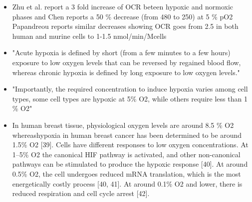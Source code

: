 \documentclass[11pt,a4paper]{article}
\begin{document}
\begin{itemize}
\item Zhu et al. report a 3 fold increase of OCR beteen hypoxic and normoxic phases \cite{Zhu2020} and Chen \cite{Chen2015} reports a 50 \% decrease (from 480 to 250) at 5 \% pO2
Papandreou reports similar decreases showing OCR goes from 2.5 in both human and murine cells to  1-1.5 nmol/min/Mcells

\item "Acute hypoxia is defined by short (from a few minutes to a few hours) exposure to low oxygen levels that can be reversed by regained blood flow, whereas chronic hypoxia is defined by long exposure to low oxygen levels." \cite{Liu2022}

\item "Importantly, the required concentration to induce hypoxia varies among cell types, some cell types are hypoxic at 5\% O2, while others require less than 1 \% O2" \cite{Liu2022}

\item In human breast tissue, physiological oxygen levels are around 8.5 \% O2 whereashypoxia in human breast cancer has been determined to be around 1.5\% O2 [39]. Cells have different responses to low oxygen concentrations. At 1–5\% O2 the canonical HIF pathway is activated, and other non-canonical pathways can be stimulated to produce the hypoxic response [40]. At around 0.5\% O2, the cell undergoes reduced mRNA translation, which is the most energetically costly process [40, 41]. At around 0.1\% O2 and lower, there is reduced respiration and cell cycle arrest [42]. \cite{Liu2022} 
\end{itemize}
\end{document}
